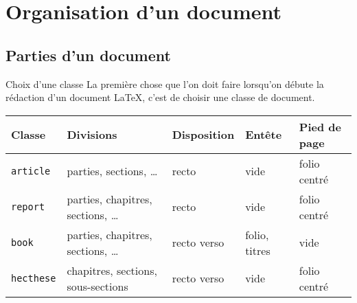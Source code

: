 
\section{Organisation d'un document}

\subsection{Parties d'un document}

\begin{frame}[c]{Choix d'une classe}
	La première chose que l'on doit faire lorsqu'on débute la rédaction d'un document \LaTeX,
	c'est de choisir une classe de document.
	
	\begin{table}[c]
		\begin{tabularx}{\textwidth}{lllll}
			\arrayrulecolor{grisPrimaire!40}\hline\hline
			\textbf{Classe} & \textbf{Divisions} & \textbf{Disposition} & \textbf{Entête} &	\textbf{Pied de page} \\
			\hline
			\texttt{article}			&	parties, sections, \ldots				&	recto		&	vide			&	folio centré \\
			\texttt{report}				&	parties, chapitres, sections, \ldots	&	recto		&	vide			&	folio centré \\
			\texttt{book}				&	parties, chapitres, sections, \ldots	&	recto verso	&
			folio, titres	&	vide \\
			\texttt{hecthese}	&	chapitres, sections, sous-sections		&	recto verso	&
			vide			&	folio centré \\
			\hline\hline
		\end{tabularx}
	\end{table}
\end{frame}

